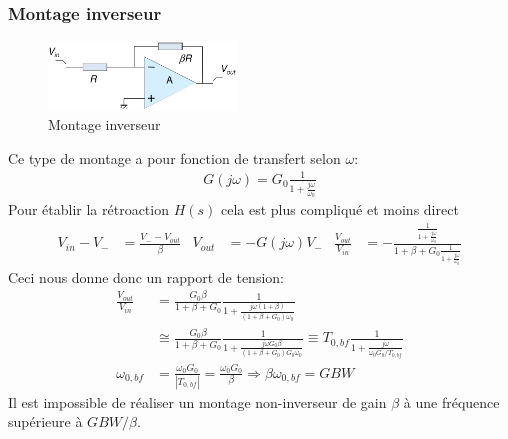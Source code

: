 \documentclass{report}
\begin{document}
\subsubsection{Montage inverseur}
\begin{figure}
\centering
\includegraphics[width=5cm]{img/inv.png}
\caption{Montage inverseur}
\end{figure}
Ce type de montage a pour fonction de transfert selon $\omega$:
\begin{align*}
G(j \omega) = G_0 \frac{1}{1 + \frac{j\omega}{\omega_0}}
\end{align*}
Pour établir la rétroaction $H(s)$ cela est plus compliqué et moins direct
\begin{align*}
V_{in} - V_{-} &= \frac{V_{-}-V_{out}}{\beta} & 
V_{out} &= -G(j\omega) V_{-} & \frac{V_{out}}{V_{in}} &= - \frac{\frac{1}{1 + \frac{j \omega}{\omega_0}}}{1+ \beta + G_0 \frac{1}{1 + \frac{j \omega}{\omega_0}}}
\end{align*}
Ceci nous donne donc un rapport de tension:
\begin{align*}
\frac{V_{out}}{V_{in}} &= \frac{G_0 \beta}{1 + \beta + G_0} \frac{1}{1 + \frac{j\omega ( 1 + \beta)}{(1 + \beta + G_0) \omega_0}}\\
& \cong \frac{G_0 \beta}{1 + \beta + G_0} \frac{1}{1 + \frac{j \omega G_0 \beta}{(1 + \beta + G_0) G_0 \omega_0}} \equiv T_{0, bf} \frac{1}{1 + \frac{j \omega}{\omega_0 G_0 / T_{0, bf}}}\\
\omega_{0, bf} &=  \frac{\omega_0 G_0}{|T_{0, bf}|} = \frac{\omega_0 G_0}{\beta} \Rightarrow \beta \omega_{0, bf} = GBW
\end{align*}
Il est impossible de réaliser un montage non-inverseur de gain $\beta$ à une fréquence supérieure à $GBW/\beta$.
\end{document}
